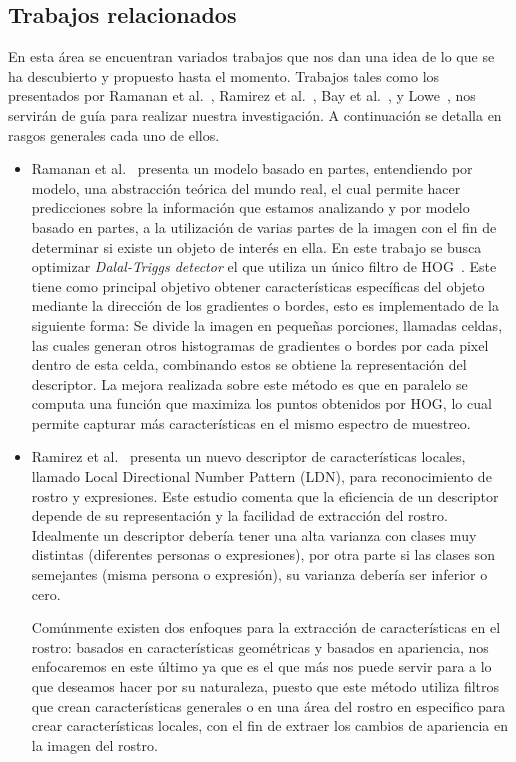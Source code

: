 \documentclass[a4paper,12pt]{article}
\begin{document}
\subsection{Trabajos relacionados}
En esta área se encuentran variados trabajos que nos dan una idea de lo que se ha descubierto y propuesto hasta el momento. Trabajos tales como los presentados por Ramanan et al.~\cite{oddt}, Ramirez et al.~\cite{ldnp}, Bay et al.~\cite{surf}, y Lowe~\cite{sift}, nos servirán de guía para realizar nuestra investigación. A continuación se detalla en rasgos generales cada uno de ellos.
\begin{itemize}
		\item Ramanan et al.~\cite{oddt} presenta un modelo basado en partes, entendiendo por modelo, una abstracción teórica del mundo real, el cual permite hacer predicciones sobre la información que estamos analizando y por modelo basado en partes, a la utilización de varias partes de la imagen con el fin de determinar si existe un objeto de interés en ella. En este trabajo se busca optimizar \textit{Dalal-Triggs detector} el que utiliza un único filtro de HOG~\cite{hog}. Este tiene como principal objetivo obtener características específicas del objeto mediante la dirección de los gradientes o bordes, esto es implementado de la siguiente forma: Se divide la imagen en pequeñas porciones, llamadas celdas, las cuales generan otros histogramas de gradientes o bordes por cada pixel dentro de esta celda, combinando estos se obtiene la representación del descriptor. La mejora realizada sobre este método es que en paralelo se computa una función que maximiza los puntos obtenidos por HOG, lo cual permite capturar más características en el mismo espectro de muestreo.
	
		\item Ramirez et al.~\cite{ldnp} presenta un nuevo descriptor de características locales, llamado Local Directional Number Pattern (LDN), para reconocimiento de rostro y expresiones. Este estudio comenta que la eficiencia de un descriptor depende de su representación y la facilidad de extracción del rostro. Idealmente un descriptor debería tener una alta varianza con clases muy distintas (diferentes personas o expresiones), por otra parte si las clases son semejantes (misma persona o expresión), su varianza debería ser inferior o cero. 

Comúnmente existen dos enfoques para la extracción de características en el rostro: basados en características geométricas y basados en apariencia, nos enfocaremos en este último ya que es el que más nos puede servir para a lo que deseamos hacer por su naturaleza, puesto que este método utiliza filtros que crean características generales o en una área del rostro en especifico para crear características locales, con el fin de extraer los cambios de apariencia en la imagen del rostro.


\end{itemize}
\end{document}
